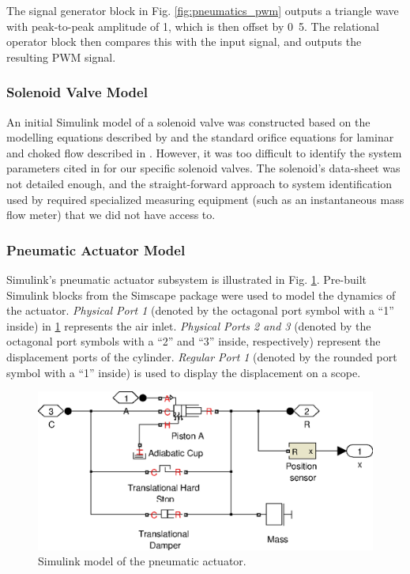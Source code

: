 
The signal generator block in Fig. \ref{fig:pneumatics_pwm} outputs a triangle wave with peak-to-peak amplitude of \unit{1}{\volt}, which is then offset by \unit{0.5}{\volt}. The relational operator block then compares this with the input signal, and outputs the resulting PWM signal.

\subsubsection{Solenoid Valve Model}

An initial Simulink model of a solenoid valve was constructed based on the modelling equations described by \citet{valve_models} and the standard orifice equations for laminar and choked flow described in \cite{fluid_power}. However, it was too difficult to identify the system parameters cited in \cite{fluid_power} for our specific solenoid valves. The solenoid's data-sheet was not detailed enough, and the straight-forward approach to system identification used by \cite{valve_models} required specialized measuring equipment (such as an instantaneous mass flow meter) that we did not have access to.

\subsubsection{Pneumatic Actuator Model}

Simulink's pneumatic actuator subsystem is illustrated in Fig. \ref{fig:pneumatics_actuator}. Pre-built Simulink blocks from the Simscape package were used to model the dynamics of the actuator. \emph{Physical Port 1} (denoted by the octagonal port symbol with a ``1'' inside) in \ref{fig:pneumatics_actuator} represents the air inlet. \emph{Physical Ports 2 and 3} (denoted by the octagonal port symbols with a ``2'' and ``3'' inside, respectively) represent the displacement ports of the cylinder. \emph{Regular Port 1} (denoted by the rounded port symbol with a ``1'' inside) is used to display the displacement on a scope.

\begin{figure}[H]
\centering
\includegraphics[scale=0.65]{implementation/figures/pneumatic_modelling3}
\caption{Simulink model of the pneumatic actuator.}
\label{fig:pneumatics_actuator}
\end{figure}

